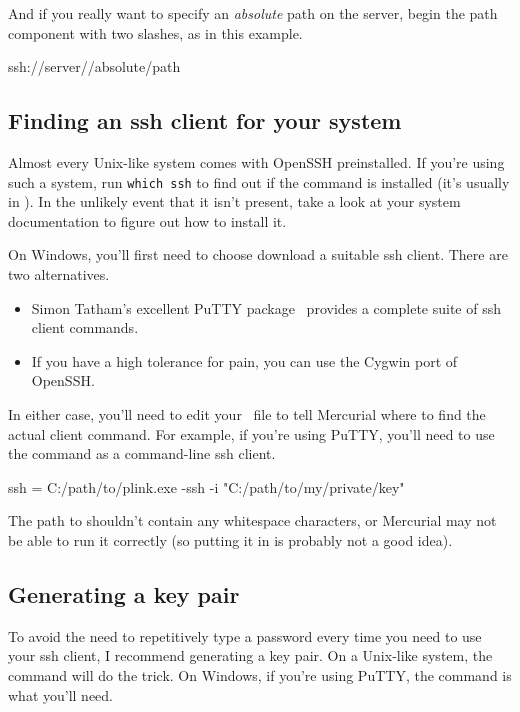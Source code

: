 And if you really want to specify an \emph{absolute} path on the
server, begin the path component with two slashes, as in this example.
\begin{codesample2}
  ssh://server//absolute/path
\end{codesample2}

\subsection{Finding an ssh client for your system}

Almost every Unix-like system comes with OpenSSH preinstalled.  If
you're using such a system, run \Verb|which ssh| to find out if
the  command is installed (it's usually in
).  In the unlikely event that it isn't present,
take a look at your system documentation to figure out how to install
it.

On Windows, you'll first need to choose download a suitable ssh
client.  There are two alternatives.
\begin{itemize}
\item Simon Tatham's excellent PuTTY package~\cite{web:putty} provides
  a complete suite of ssh client commands.
\item If you have a high tolerance for pain, you can use the Cygwin
  port of OpenSSH.
\end{itemize}
In either case, you'll need to edit your \hgini\ file to tell
Mercurial where to find the actual client command.  For example, if
you're using PuTTY, you'll need to use the  command as
a command-line ssh client.
\begin{codesample2}
  [ui]
  ssh = C:/path/to/plink.exe -ssh -i "C:/path/to/my/private/key"
\end{codesample2}

\begin{note}
  The path to  shouldn't contain any whitespace
  characters, or Mercurial may not be able to run it correctly (so
  putting it in  is probably not a good
  idea).
\end{note}

\subsection{Generating a key pair}

To avoid the need to repetitively type a password every time you need
to use your ssh client, I recommend generating a key pair.  On a
Unix-like system, the  command will do the trick.
On Windows, if you're using PuTTY, the  command is
what you'll need.

